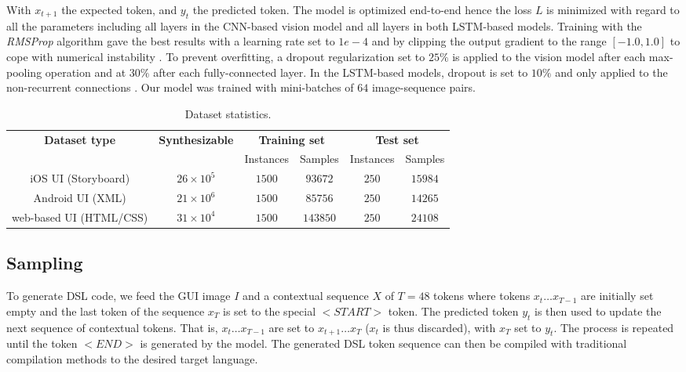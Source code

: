 \documentclass{article}
\begin{document}
With $x_{t+1}$ the expected token, and $y_{t}$ the predicted token. The model is optimized end-to-end hence the loss $L$ is minimized with regard to all the parameters including all layers in the CNN-based vision model and all layers in both LSTM-based models. Training with the \emph{RMSProp} algorithm \cite{tieleman2012lecture} gave the best results with a learning rate set to $1e-4$ and by clipping the output gradient to the range $[-1.0, 1.0]$ to cope with numerical instability \cite{graves2013generating}. To prevent overfitting, a dropout regularization \cite{srivastava2014dropout} set to $25\%$ is applied to the vision model after each max-pooling operation and at $30\%$ after each fully-connected layer. In the LSTM-based models, dropout is set to $10\%$ and only applied to the non-recurrent connections \cite{zaremba2014recurrent}. Our model was trained with mini-batches of $64$ image-sequence pairs.

\begin{table}[H]
    \caption{Dataset statistics.}
    \centering
    \begin{tabular}{| c | c | c | c | c | c |} \hline
        \multirow{2}{*}{\textbf{Dataset type}} &
        \multirow{2}{*}{\textbf{Synthesizable}} &
        \multicolumn{2}{c|}{\textbf{Training set}} & \multicolumn{2}{c|}{\textbf{Test set}} \\ \cline{3-6}
        & & Instances & Samples & Instances & Samples \\ \hline
        iOS UI (Storyboard) & $26 \times 10^5$ & $1500$ & $93672$ & $250$ & $15984$ \\ \hline
        Android UI (XML) & $21 \times 10^6$ & $1500$ & $85756$ & $250$ & $14265$ \\ \hline
        web-based UI (HTML/CSS) & $31 \times 10^4$ & $1500$ & $143850$ & $250$ & $24108$ \\ \hline
    \end{tabular}
    \label{tab:dataset}
\end{table}

\subsection{Sampling}

To generate DSL code, we feed the GUI image $I$ and a contextual sequence $X$ of $T=48$ tokens where tokens $x_t \ldots x_{T-1}$ are initially set empty and the last token of the sequence $x_T$ is set to the special $<START>$ token. The predicted token $y_t$ is then used to update the next sequence of contextual tokens. That is, $x_t \ldots x_{T-1}$ are set to $x_{t+1} \ldots x_{T}$ ($x_t$ is thus discarded), with $x_T$ set to $y_t$. The process is repeated until the token $<END>$ is generated by the model.
The generated DSL token sequence can then be compiled with traditional compilation methods to the desired target language.
\end{document}
